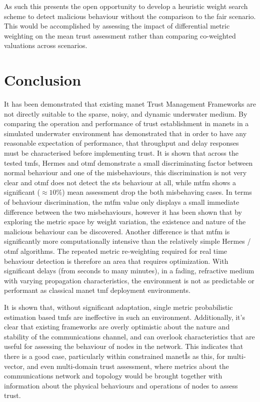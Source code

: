 As such this presents the open opportunity to develop a heuristic weight search scheme to detect malicious behaviour without the comparison to the fair scenario.
This would be accomplished by assessing the impact of differential metric weighting on the mean trust assessment rather than comparing co-weighted valuations across scenarios.

\section{Conclusion}
It has been demonstrated that existing \gls{manet} Trust Management Frameworks are not directly suitable to the sparse, noisy, and dynamic underwater medium.
By comparing the operation and performance of trust establishment in \glspl{manet} in a simulated underwater environment has demonstrated that in order to have any reasonable expectation of performance, that throughput and delay responses must be characterised before implementing trust. 
It is shown that across the tested \glspl{tmf}, Hermes and \gls{otmf} demonstrate a small discriminating factor between normal behaviour and one of the misbehaviours, this discrimination is not very clear and \gls{otmf} does not detect the \gls{sts} behaviour at all, while \gls{mtfm} shows a significant ($\approx 10\%$) mean assessment drop the both misbehaving cases. 
In terms of behaviour discrimination, the \gls{mtfm} value only displays a small immediate difference between the two misbehaviours, however it has been shown that by exploring the metric space by weight variation, the existence and nature of the malicious behaviour can be discovered.
Another difference is that \gls{mtfm} is significantly more computationally intensive than the relatively simple Hermes / \gls{otmf} algorithms.
The repeated metric re-weighting required for real time behaviour detection is therefore an area that requires optimization.
With significant delays (from seconds to many minutes), in a fading, refractive medium with varying propagation characteristics, the environment is not as predictable or performant as classical \gls{manet} \gls{tmf} deployment environments.

It is shown that, without significant adaptation, single metric probabilistic estimation based \glspl{tmf} are ineffective in such an environment.
Additionally, it's clear that existing frameworks are overly optimistic about the nature and stability of the communications channel, and can overlook characteristics that are useful for assessing the behaviour of nodes in the network. 
This indicates that there is a good case, particularly within constrained \gls{manet}Ìs as this, for multi-vector, and even multi-domain trust assessment, where metrics about the communications network and topology would be brought together with information about the physical behaviours and operations of nodes to assess trust.

